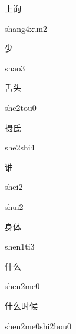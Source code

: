 \begin{verbete}{上询}
\begin{pronuncia}{shang4xun2}
\end{pronuncia}
\end{verbete}

\begin{verbete}[shao3]{少}
\begin{pronuncia}{shao3}
\end{pronuncia}
\end{verbete}

\begin{verbete}{舌头}
\begin{pronuncia}{she2tou0}
\end{pronuncia}
\end{verbete}

\begin{verbete}{摄氏}
\begin{pronuncia}{she2shi4}
\end{pronuncia}
\end{verbete}

\begin{verbete}[shei2]{谁}
\begin{pronuncia}{shei2}
\end{pronuncia}
\begin{pronuncia}{shui2}
\end{pronuncia}
\end{verbete}

\begin{verbete}[shen1ti3]{身体}
\begin{pronuncia}{shen1ti3}
\end{pronuncia}
\end{verbete}

\begin{verbete}[shen2me0]{什么}
\begin{pronuncia}{shen2me0}
\end{pronuncia}
\end{verbete}

\begin{verbete}{什么时候}
\begin{pronuncia}{shen2me0shi2hou0}
\end{pronuncia}
\end{verbete}

